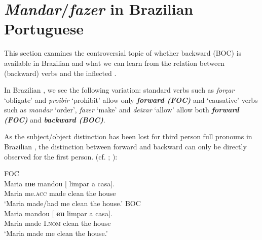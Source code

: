 \documentclass[output=paper]{langsci/langscibook}
\begin{document}
\section{\textit{Mandar}/\textit{fazer} in Brazilian Portuguese}%

This section examines the controversial topic of whether backward  (BOC) is available in Brazilian  and what we can learn from the relation between (backward)  verbs and the inflected .

In Brazilian , we see the following variation: standard  verbs such as \textit{forçar} ‘obligate’ and \textit{proibir} ‘prohibit’ allow only \textbf{\textit{forw}}\textbf{\textit{ard  (FOC)}}  and ‘causative’  verbs such as \textit{mandar} ‘order’, \textit{fazer} ‘make’ and \textit{deixar} ‘allow’ allow both \textbf{\textit{forward (FOC)}} and \textbf{\textit{backward  (BOC)}}.  

As the subject\slash object distinction has been lost for third person full pronouns in Brazilian , the distinction between forward and backward  can only be directly observed for the first person. (cf. \citealt{Farrell1995}; \citealt{Boeckx2004,Boeckx2006}):

\ea%
    \label{ex:moreno:5}
    \z
\z    



\ea%
    \label{ex:moreno:6}
    \ea  FOC\\
    \gll Maria  \textbf{me}        mandou  [ limpar a    casa].      \\
         Maria  me.\textsc{acc} made     {}  clean   the house\\
    \glt ‘Maria made/had me clean the house.’
    \ex  BOC \\
    \gll Maria mandou [ \textbf{eu}        limpar a   casa].      \\
         Maria made     {}  I.\textsc{nom}  clean  the house\\
    \glt ‘Maria made me clean the house.’
    \z
\z    
\end{document}
